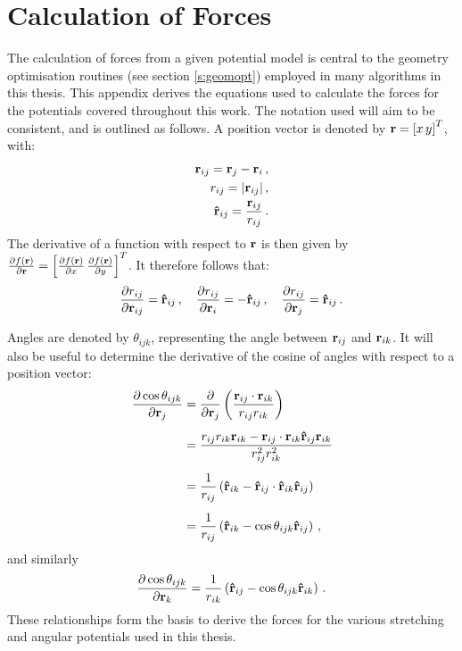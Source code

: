 \chapter{Calculation of Forces}
\label{app:forces}

The calculation of forces from a given potential model is central to the geometry optimisation routines (see section \ref{s:geomopt}) employed in many algorithms in this thesis.
This appendix derives the equations used to calculate the forces for the potentials covered throughout this work.
The notation used will aim to be consistent, and is outlined as follows.
A position vector is denoted by $\mathbf{r}=\left[x\, y\right]^{T}$, with:
\begin{align}
	\mathbf{r}_{ij}=\mathbf{r}_j-\mathbf{r}_i\,, \\
	r_{ij}=\lvert\mathbf{r}_{ij}\rvert\,, \\
	\boldsymbol{\hat{\mathbf{r}}}_{ij}=\frac{\mathbf{r}_{ij}}{r_{ij}}\,.
\end{align}
The derivative of a function with respect to $\mathbf{r}$ is then given by $\frac{\partial f\left(\mathbf{r}\right) }{\partial \mathbf{r}}=\left[\frac{\partial f\left(\mathbf{r}\right)}{\partial x}\, \frac{\partial f\left(\mathbf{r}\right)}{\partial y}\right]^{T}$.
It therefore follows that:
\begin{align}
	\frac{\partial r_{ij}}{\partial\mathbf{r}_{ij}}=\boldsymbol{\hat{\mathbf{r}}}_{ij}\,,\quad \frac{\partial r_{ij}}{\partial \mathbf{r}_i}=-\boldsymbol{\hat{\mathbf{r}}}_{ij}\,,\quad \frac{\partial r_{ij}}{\partial \mathbf{r}_j}=\boldsymbol{\hat{\mathbf{r}}}_{ij} \,.
\end{align}

Angles are denoted by $\theta_{ijk}$, representing the angle between $\mathbf{r}_{ij}$ and $\mathbf{r}_{ik}$. 
It will also be useful to determine the derivative of the cosine of angles with respect to a position vector:
\begin{align}
	\frac{\partial \cos\theta_{ijk}}{\partial \mathbf{r}_j} &= \frac{\partial}{\partial \mathbf{r}_j}\left(\frac{\mathbf{r}_{ij}\cdot\mathbf{r}_{ik}}{r_{ij}r_{ik}}\right) \nonumber \\[0.5em]
	&= \frac{r_{ij}r_{ik}\mathbf{r}_{ik}-\mathbf{r}_{ij}\cdot\mathbf{r}_{ik}\boldsymbol{\hat{\mathbf{r}}}_{ij}\mathbf{r}_{ik}}{r_{ij}^2r_{ik}^2} \nonumber \\[0.5em]
	&= \frac{1}{r_{ij}}\left(\boldsymbol{\hat{\mathbf{r}}}_{ik}-\boldsymbol{\hat{\mathbf{r}}}_{ij}\cdot\boldsymbol{\hat{\mathbf{r}}}_{ik}\boldsymbol{\hat{\mathbf{r}}}_{ij}\right) \nonumber \\[0.5em]
	&= \frac{1}{r_{ij}}\left(\boldsymbol{\hat{\mathbf{r}}}_{ik}-\cos\theta_{ijk}\boldsymbol{\hat{\mathbf{r}}}_{ij}\right)\,,
\end{align}
and similarly
\begin{equation}
	\frac{\partial \cos\theta_{ijk}}{\partial \mathbf{r}_k} = \frac{1}{r_{ik}}\left(\boldsymbol{\hat{\mathbf{r}}}_{ij}-\cos\theta_{ijk}\boldsymbol{\hat{\mathbf{r}}}_{ik}\right)\,.
\end{equation}
These relationships form the basis to derive the forces for the various stretching and angular potentials used in this thesis.

